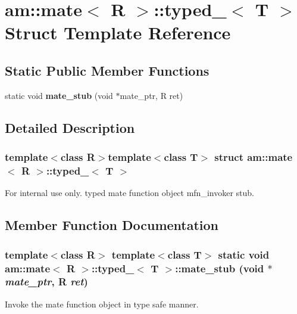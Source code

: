 \section{am::mate$<$ R $>$::typed\_\-$<$ T $>$ Struct Template Reference}
\label{structam_1_1mate_1_1typed__}
\subsection*{Static Public Member Functions}
\begin{CompactItemize}
\item 
static void {\bf mate\_\-stub} (void $\ast$mate\_\-ptr, R ret)
\end{CompactItemize}


\subsection{Detailed Description}
\subsubsection*{template$<$class R$>$template$<$class T$>$ struct am::mate$<$ R $>$::typed\_\-$<$ T $>$}

\begin{Desc}
\item[For internal use only.]
typed mate function object mfn\_\-invoker stub. \end{Desc}




\subsection{Member Function Documentation}
\subsubsection{\setlength{\rightskip}{0pt plus 5cm}template$<$class R$>$ template$<$class T$>$ static void {\bf am::mate}$<$ R $>$::{\bf typed\_\-}$<$ T $>$::mate\_\-stub (void $\ast$ {\em mate\_\-ptr}, R {\em ret})\hspace{0.3cm}{\tt  [inline, static]}}\label{structam_1_1mate_1_1typed___604d3e830773c811354ba20ad1b0ec2f}


Invoke the mate function object in type safe manner.

